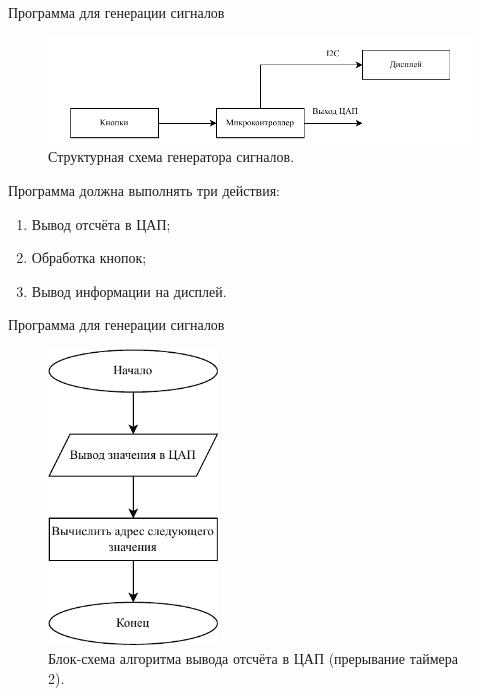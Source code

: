 \documentclass[10pt]{beamer}
\begin{document}
\begin{frame}{Программа для генерации сигналов}
  \begin{figure}
  \includegraphics[width=1\textwidth]{struct_gen}
  \caption*{Структурная схема генератора сигналов.}
  \end{figure}
  Программа должна выполнять три действия:
  	\begin{enumerate}
		\item Вывод отсчёта в ЦАП;
		\item Обработка кнопок;
		\item Вывод информации на дисплей.
	\end{enumerate}
\end{frame}

\begin{frame}{Программа для генерации сигналов}
  \begin{figure}
  \includegraphics[width=0.4\textwidth]{dac}
  \caption*{Блок-схема алгоритма вывода отсчёта в ЦАП (прерывание таймера 2).}
  \end{figure}
\end{frame}
\end{document}
